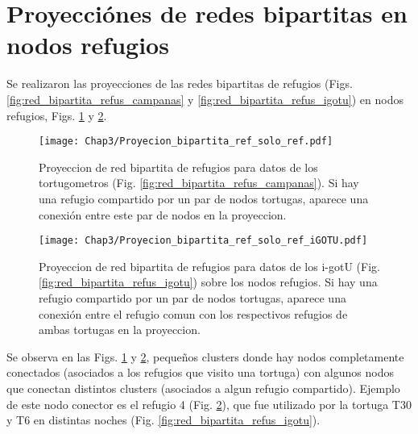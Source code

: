 \section{Proyecciónes de redes bipartitas en nodos refugios}
Se realizaron las proyecciones de las redes bipartitas de refugios (Figs. \ref{fig:red_bipartita_refus_campanas} y \ref{fig:red_bipartita_refus_igotu}) en nodos refugios, Figs. \ref{fig:proyeccion_red_campanas_refus} y \ref{fig:proyeccion_red_igotu_refus}.


\begin{figure}[ht]
    \begin{center}
        \texttt{[image: Chap3/Proyecion\_bipartita\_ref\_solo\_ref.pdf]}
        \caption[Proyeccion  de red bipartita de refugios para datos de los tortugometros en nodos refugios.]{Proyeccion  de red bipartita de refugios para datos de los tortugometros (Fig. \ref{fig:red_bipartita_refus_campanas}). Si hay una refugio compartido por un par de nodos tortugas, aparece una conexión entre este par de nodos en la proyeccion. } 
        \label{fig:proyeccion_red_campanas_refus}
        
        \end{center}
\end{figure} 

\begin{figure}[ht]
    \begin{center}
        \texttt{[image: Chap3/Proyecion\_bipartita\_ref\_solo\_ref\_iGOTU.pdf]}
        \caption[Proyeccion  de red bipartita de refugios para datos de los i-gotU en nodos refugios.]{Proyeccion  de red bipartita de refugios para datos de los i-gotU (Fig. \ref{fig:red_bipartita_refus_igotu}) sobre los nodos refugios. Si hay una refugio compartido por un par de nodos tortugas, aparece una conexión entre el refugio comun con los respectivos refugios de ambas tortugas en la proyeccion. } 
        \label{fig:proyeccion_red_igotu_refus}
        
        \end{center}
\end{figure} 
Se observa en las Figs. \ref{fig:proyeccion_red_campanas_refus} y \ref{fig:proyeccion_red_igotu_refus}, pequeños clusters donde hay nodos completamente conectados (asociados a los refugios que visito una tortuga) con algunos nodos que conectan distintos clusters (asociados a algun refugio compartido). Ejemplo de este nodo conector es el refugio 4 (Fig. \ref{fig:proyeccion_red_igotu_refus}), que fue utilizado por la tortuga T30 y T6 en distintas noches (Fig. \ref{fig:red_bipartita_refus_igotu}). 

